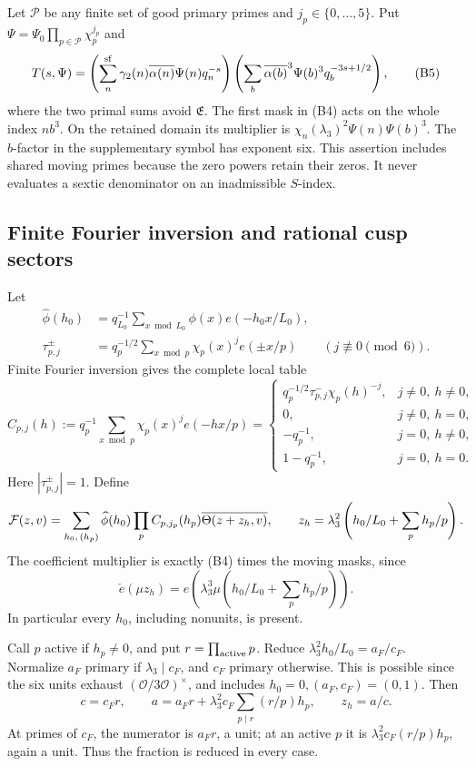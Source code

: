 \documentclass[12pt]{article}
\begin{document}
Let \(\mathcal P\) be any finite set of good primary primes and
\(j_p\in\{0,\ldots,5\}\).
Put \(\Psi=\Psi_0\prod_{p\in\mathcal P}\chi_p^{j_p}\) and
\[
 T(s,\Psi)=
 \left(\sum_n^{\rm sf}
       \gamma_2(n)\overline{\alpha(n)}\Psi(n)q_n^{-s}\right)
 \left(\sum_b\overline{\alpha(b)}^3\Psi(b)^3q_b^{-3s+1/2}\right),
 \tag{B5}\label{eq:completion-product}
\]
where the two primal sums avoid \(\mathfrak E\).
The first mask in (B4) acts on the whole index \(nb^3\).
On the retained domain its multiplier is
\(\chi_n(\lambda_3)^2\Psi(n)\Psi(b)^3\).
The \(b\)-factor in the supplementary symbol has exponent six.
This assertion includes shared moving primes because the zero
powers retain their zeros.  It never evaluates a sextic
denominator on an inadmissible \(S\)-index.

\subsection{Finite Fourier inversion and rational cusp sectors}

Let
\[
 \begin{aligned}
 \widehat\phi(h_0)&=q_{L_0}^{-1}
                       \sum_{x\bmod L_0}\phi(x)e(-h_0x/L_0),\\
 \tau_{p,j}^{\pm}&=q_p^{-1/2}\sum_{x\bmod p}
                    \chi_p(x)^j e(\pm x/p)
                       \qquad(j\not\equiv0\pmod6).
 \end{aligned}
\]
Finite Fourier inversion gives the complete local table
\[
 C_{p,j}(h):=q_p^{-1}\sum_{x\bmod p}\chi_p(x)^j e(-hx/p)
 =\begin{cases}
 q_p^{-1/2}\tau_{p,j}^-\chi_p(h)^{-j},&j\ne0,\ h\ne0,\\
 0,&j\ne0,\ h=0,\\
 -q_p^{-1},&j=0,\ h\ne0,\\
 1-q_p^{-1},&j=0,\ h=0 .
 \end{cases}
 \tag{B6}\label{eq:all-frequencies}
\]
Here \(|\tau_{p,j}^\pm|=1\).  Define
\[
 {\cal F}(z,v)=\sum_{h_0,\,(h_p)}
 \widehat\phi(h_0)\prod_pC_{p,j_p}(h_p)
             \overline{\Theta(z+z_h,v)},\qquad
 z_h=\lambda_3^2\left(h_0/L_0+\sum_p h_p/p\right).
\]
The coefficient multiplier is exactly (B4) times the moving
masks, since
\[
 \check e(\mu z_h)=e\!\left(\lambda_3^3\mu
                                   (h_0/L_0+\sum_p h_p/p)\right).
\]
In particular every \(h_0\), including nonunits, is present.

Call \(p\) active if \(h_p\ne0\), and put \(r=\prod_{\rm active}p\).
Reduce \(\lambda_3^2h_0/L_0=a_F/c_F\).
Normalize \(a_F\) primary if \(\lambda_3\mid c_F\), and
\(c_F\) primary otherwise.  This is possible since the six units
exhaust \((\mathcal O/3\mathcal O)^\times\), and includes
\(h_0=0,(a_F,c_F)=(0,1)\).
Then
\[
 c=c_Fr,\qquad
 a=a_Fr+\lambda_3^2c_F\sum_{p\mid r}(r/p)h_p,\qquad z_h=a/c.
 \tag{B7}
\]
At primes of \(c_F\), the numerator is \(a_Fr\), a unit; at an
active \(p\) it is \(\lambda_3^2c_F(r/p)h_p\), again a unit.
Thus the fraction is reduced in every case.
\end{document}
